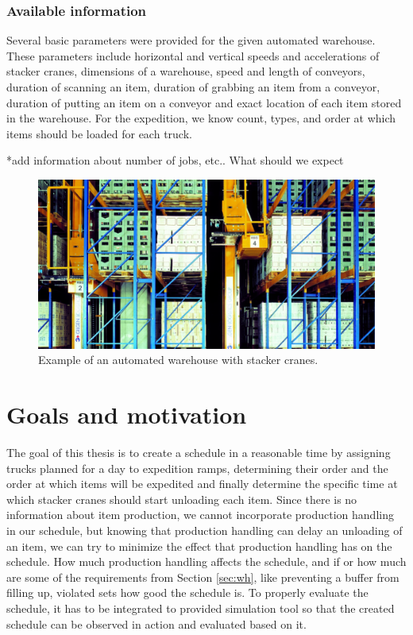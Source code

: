 \documentclass{ctuthesis}
\begin{document}
\subsubsection{Available information}

Several basic parameters were provided for the given automated warehouse. These parameters include horizontal and vertical speeds and accelerations of stacker cranes, dimensions of a warehouse, speed and length of conveyors, duration of scanning an item, duration of grabbing an item from a conveyor, duration of putting an item on a conveyor and exact location of each item stored in the warehouse. For the expedition, we know count, types, and order at which items should be loaded for each truck. 

*add information about number of jobs, etc.. What should we expect

\begin{figure}
\includegraphics[width=0.8\linewidth]{highbaywarehouse.jpg}
\caption{Example of an automated warehouse with stacker cranes. \cite{warehousepic}}
\label{fig:foobar}
\end{figure}

\section{Goals and motivation}

The goal of this thesis is to create a schedule in a reasonable time by assigning trucks planned for a day to expedition ramps, determining their order and the order at which items will be expedited and finally determine the specific time at which stacker cranes should start unloading each item. Since there is no information about item production, we cannot incorporate production handling in our schedule, but knowing that production handling can delay an unloading of an item, we can try to minimize the effect that production handling has on the schedule. How much production handling affects the schedule, and if or how much are some of the requirements from Section \ref{sec:wh}, like preventing a buffer from filling up, violated sets how good the schedule is. To properly evaluate the schedule, it has to be integrated to provided simulation tool so that the created schedule can be observed in action and evaluated based on it. 
\end{document}

